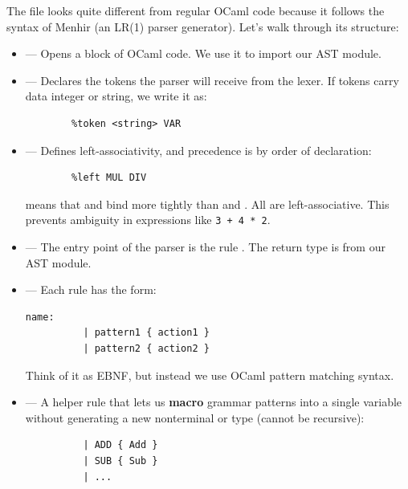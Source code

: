     \begin{Example}

        The  file looks quite different from regular OCaml code because it follows the syntax of Menhir (an LR(1) parser generator). Let's walk through its structure:
        
        \begin{itemize}
            \item {} — Opens a block of OCaml code. We use it to import our AST module.
        
            \item {} — Declares the tokens the parser will receive from the lexer. If tokens carry data integer or string, we write it as:
            \begin{lstlisting}[numbers=none]
        %token <int> NUM
        %token <string> VAR
            \end{lstlisting}
        
            \item {} — Defines left-associativity, and precedence is by order of declaration:
            \begin{lstlisting}[numbers=none]
        %left ADD SUB
        %left MUL DIV
            \end{lstlisting}
            means that  and  bind more tightly than  and . All are left-associative. This prevents ambiguity in expressions like \texttt{3 + 4 * 2}.
        
            \item {} — The entry point of the parser is the rule . The return type is  from our AST module.
           
        
            \item {} — Each rule has the form:
            \begin{lstlisting}[numbers=none]
        name:
          | pattern1 { action1 }
          | pattern2 { action2 }
            \end{lstlisting}
            Think of it as EBNF, but instead we use OCaml pattern matching syntax.
        
            \item {} — A helper rule that lets us \textbf{macro} grammar patterns into a single variable without generating a new nonterminal or type (cannot be recursive):
            \begin{lstlisting}[numbers=none]
        %inline bop:
          | ADD { Add }
          | SUB { Sub }
          | ...
            \end{lstlisting}
        
        \end{itemize}
        \end{Example}

